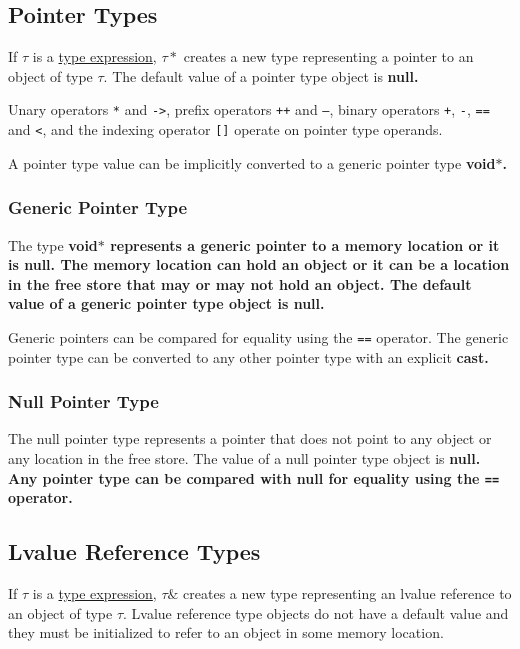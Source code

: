 \documentclass[a4paper,oneside,11pt]{article}
\begin{document}
\subsection{Pointer Types}\label{sec:pointertypes}

If $\tau$ is a \hyperref[typeexpr]{type expression}, $\tau*$ creates a new type representing a pointer to an object of type $\tau$.
The default value of a pointer type object is \bf{null}.

Unary operators \texttt{*} and \texttt{->}, prefix operators \texttt{++} and \texttt{--},
binary operators \texttt{+}, \texttt{-}, \texttt{==} and \texttt{<},
and the indexing operator \texttt{[]} operate on pointer type operands.

A pointer type value can be implicitly converted to a generic pointer type \bf{void$*$}.

\subsubsection{Generic Pointer Type}

The type \bf{void$*$} represents a generic pointer to a memory location or it is \bf{null}.
The memory location can hold an object or it can be a location in the free store that
may or may not hold an object.
The default value of a generic pointer type object is \bf{null}.

Generic pointers can be compared for equality using the \texttt{==} operator.
The generic pointer type can be converted to any other pointer type with an explicit \bf{cast}.

\subsubsection{Null Pointer Type}

The null pointer type represents a pointer that does not point to any object or any location in the free store.
The value of a null pointer type object is \bf{null}.
Any pointer type can be compared with \bf{null} for equality using the \texttt{==} operator.

\subsection{Lvalue Reference Types}\label{sec:lvaluereferencetypes}

If $\tau$ is a \hyperref[typeexpr]{type expression}, $\tau\&$ creates a new type representing an lvalue reference to an object of type $\tau$.
Lvalue reference type objects do not have a default value and they must be initialized to refer to an object in some memory location.
\end{document}
